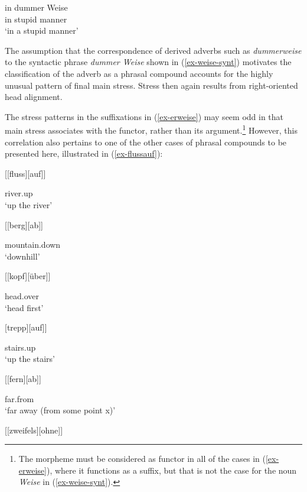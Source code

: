 \documentclass[output=paper
 ,nobabel
 ,draftmode
 ,colorlinks, citecolor=brown
]{langscibook}
\begin{document}
\ea\label{ex-weise-synt}
\gll in dummer Weise \\
     in stupid manner\\
\glt `in a stupid manner' 
\z

\largerpage
\noindent
The assumption that the correspondence of derived adverbs such as \emph{dummerweise} to the syntactic phrase \emph{dummer Weise} shown in (\ref{ex-weise-synt}) motivates the classification of the adverb as a phrasal compound accounts for the highly unusual pattern of final main stress. Stress then again results from right-oriented head alignment. 

The stress patterns in the suffixations in (\ref{ex-erweise}) may seem odd in that main stress associates with the functor, rather than its argument.\footnote{The morpheme  must be considered as functor in all of the cases in (\ref{ex-erweise}), where it functions as a suffix, but that is not the case for the noun \emph{Weise} in (\ref{ex-weise-synt}).} However, this correlation also pertains to one of the other cases of phrasal compounds to be presented here, illustrated in (\ref{ex-flussauf}):

\largerpage
\settowidth{}
\ea\label{ex-flussauf}
\ea {}[[fluss][auf]] 

river.up\\
`up the river'		

\ex {}[[berg][ab]] 

mountain.down\\
`downhill'		

\ex {}[[kopf][über]] 

head.over\\
`head first'		

\ex {}[trepp][auf]] 

stairs.up\\
`up the stairs'		

\ex {}[[fern][ab]] 

far.from\\
`far away (from some point x)'		

\ex {}[[zweifels][ohne]] 
\end{document}
